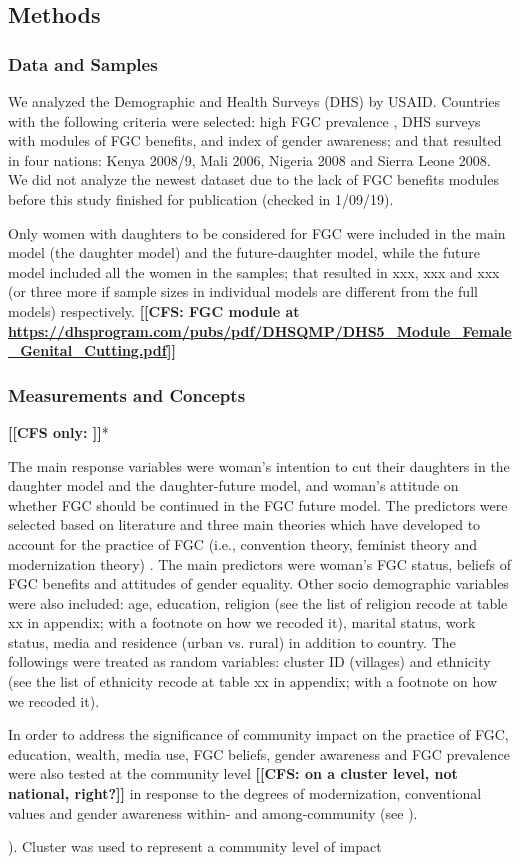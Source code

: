 \documentclass[12pt,]{article}
\newcommand{\comment}[1]{\textbf{[[#1]]}}
\newcommand{\cfcmt}[1]{\comment{CFS: #1}}
\newcommand{\cfonly}[1]{\comment{CFS only: #1}}
\begin{document}
{\subsection{Methods}\label{methods}

\subsubsection{Data and Samples}\label{data-and-samples}

We analyzed the Demographic and Health Surveys (DHS) by USAID.  Countries with the following criteria were selected:  high FGC prevalence \cite{UNIC16}, DHS surveys with modules of FGC benefits, and index of gender awareness; and that resulted in four nations:  Kenya 2008/9, Mali 2006, Nigeria 2008 and Sierra Leone 2008.  We did not analyze the newest dataset due to the lack of FGC benefits modules before this study finished for publication (checked in 1/09/19).

Only women with daughters to be considered for FGC were included in the main model (the daughter model) and the future-daughter model, while the future model included all the women in the samples; that resulted in xxx, xxx and xxx (or three more if sample sizes in individual models are different from the full models) respectively.
\cfcmt{FGC module at \url{https://dhsprogram.com/pubs/pdf/DHSQMP/DHS5_Module_Female_Genital_Cutting.pdf}}

\subsubsection{Measurements and Concepts}\label{measurements-and-concepts}
\cfonly{\cite{Rima08}}*

The main response variables were woman's intention to cut their daughters in the daughter model and the daughter-future model, and woman's attitude on whether FGC should be continued in the FGC future model.  The predictors were selected based on literature and three main theories which have developed to account for the practice of FGC (i.e., convention theory, feminist theory and modernization theory) \cite{Fay05, BellNova15}.  The main predictors were woman's FGC status, beliefs of FGC benefits and attitudes of gender equality.  Other socio demographic variables were also included:  age, education, religion (see the list of religion recode at table xx in appendix; with a footnote on how we recoded it), marital status, work status, media and residence (urban vs. rural) in addition to country.  The followings were treated as random variables:  cluster ID (villages) and ethnicity (see the list of ethnicity recode at table xx in appendix; with a footnote on how we recoded it).

In order to address the significance of community impact on the practice of FGC, education, wealth, media use, FGC beliefs, gender awareness and FGC prevalence were also tested at the community level \cfcmt{on a cluster level, not national, right?} in response to the degrees of modernization, conventional values and gender awareness within- and among-community (see \cite{Achi14, BoylMcMo02, Hayf05, KandNwak09, ModrLiu13, Moor13, OdukAfol17, Youn02}).}).  Cluster  was used to represent a community level of impact \cite{AligRen06, Hayf05}
\end{document}

